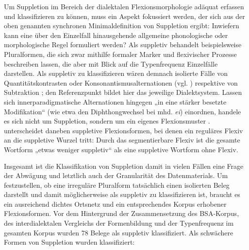 Um Suppletion im Bereich der dialektalen Flexionsmorphologie adäquat erfassen und klassifizieren zu können, muss ein Aspekt fokussiert werden, der sich aus der oben genannten synchronen Minimaldefinition von Suppletion ergibt: Inwiefern kann eine über den Einzelfall hinausgehende allgemeine phonologische oder morphologische Regel formuliert werden? Als suppletiv behandelt beispielsweise \citet[129, 166]{Rowley1997} Pluralformen, die sich zwar mithilfe formaler Marker und flexivischer Prozesse beschreiben lassen, die aber mit Blick auf die Typenfrequenz Einzelfälle darstellen. Als suppletiv zu klassifizieren wären demnach isolierte Fälle von Quantitätskontrasten oder Konsonantismusalternationen (vgl. \citealt[124, 165]{Rowley1997}) respektive von Subtraktion \citep[583]{Dressler2000}; den Referenzpunkt bildet hier das jeweilige Dialektsystem. Lassen sich innerparadigmatische Alternationen hingegen „in eine stärker besetzte Modifikation“ (wie etwa den Diphthongwechsel bei mhd. \textit{ei}) einordnen, handele es sich nicht um Suppletion, sondern um ein eigenes Flexionsmuster \citep[129]{Rowley1997}. \citet[78]{Nübling1999} unterscheidet daneben suppletive Flexionsformen, bei denen ein reguläres Flexiv an die suppletive Wurzel tritt: Durch das segmentierbare Flexiv ist die gesamte Wortform „etwas weniger suppletiv“ als eine suppletive Wortform ohne Flexiv.

Insgesamt ist die Klassifikation von Suppletion damit in vielen Fällen eine Frage der Abwägung und letztlich auch der Granularität des Datenmaterials. Um festzustellen, ob eine irreguläre Pluralform tatsächlich einen isolierten Beleg darstellt und damit möglicherweise als suppletiv zu klassifizieren ist, braucht es ein ausreichend dichtes Ortsnetz und ein entsprechendes Korpus erhobener Flexionsformen. Vor dem Hintergrund der Zusammensetzung des BSA-Korpus, des interdialektalen Vergleichs der Formenbildung und der Typenfrequenz im gesamten Korpus wurden 78 Belege als suppletiv klassifiziert. Als schwächere Formen von Suppletion wurden klassifiziert:

